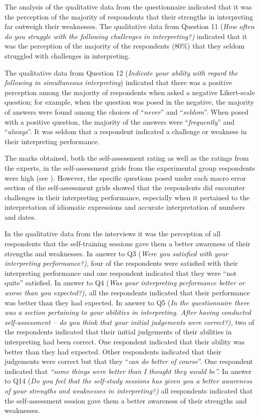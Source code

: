\documentclass[output=paper]{langsci/langscibook}
\begin{document}
The analysis of the qualitative data from the questionnaire indicated that it was the perception of the majority of respondents that their strengths in interpreting far outweigh their weaknesses. The qualitative data from Question 11 (\textit{How often do you struggle with the following challenges in interpreting?)} indicated that it was the perception of the majority of the respondents (80\%) that they seldom struggled with challenges in interpreting. 

The qualitative data from Question 12 (\textit{Indicate your ability with regard the following in simultaneous interpreting}) indicated that there was a positive perception among the majority of respondents when asked a negative Likert-scale question; for example, when the question was posed in the negative, the majority of answers were found among the choices of “\textit{never}” and “\textit{seldom}”. When posed with a positive question, the majority of the answers were “\textit{frequently}” and “\textit{always}”. It was seldom that a respondent indicated a challenge or weakness in their interpreting performance. 

The marks obtained, both the self-assessment rating as well as the ratings from the experts, in the self-assessment grids from the experimental group respondents were high (see ). However, the specific questions posed under each macro error section of the self-assessment grids showed that the respondents did encounter challenges in their interpreting performance, especially when it pertained to the interpretation of idiomatic expressions and accurate interpretation of numbers and dates.  

In the qualitative data from the interviews it was the perception of all respondents that the self-training sessions gave them a better awareness of their strengths and weaknesses. In answer to Q3 (\textit{Were you satisfied with your interpreting performance?)}, four of the respondents were satisfied with their interpreting performance and one respondent indicated that they were “not quite” satisfied. In answer to Q4 (\textit{Was your interpreting performance better or worse than you expected?),} all the respondents indicated that their performance was better than they had expected. In answer to Q5 (\textit{In the questionnaire there was a section pertaining to your abilities in interpreting. After having conducted self-assessment – do you think that your initial judgements were correct?),} two of the respondents indicated that their initial judgements of their abilities in interpreting had been correct. One respondent indicated that their ability was better than they had expected. Other respondents indicated that their judgements were correct but that they “\textit{can do better of course}”. One respondent indicated that \textit{“some things were better than I thought they would be”.} In answer to Q14 (\textit{Do you feel that the self-study sessions has given you a better awareness of your strengths and weaknesses in interpreting?)} all respondents indicated that the self-assessment session gave them a better awareness of their strengths and weaknesses. 
\end{document}
